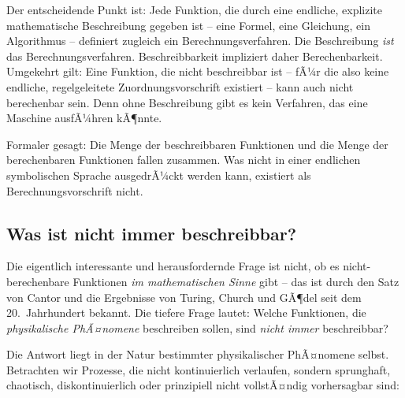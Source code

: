 ﻿\documentclass[12pt, a4paper]{article}
\begin{document}
	Der entscheidende Punkt ist: Jede Funktion, die durch eine endliche, explizite mathematische Beschreibung gegeben ist -- eine Formel, eine Gleichung, ein Algorithmus -- definiert zugleich ein Berechnungsverfahren. Die Beschreibung \textit{ist} das Berechnungsverfahren. Beschreibbarkeit impliziert daher Berechenbarkeit. Umgekehrt gilt: Eine Funktion, die nicht beschreibbar ist -- fÃ¼r die also keine endliche, regelgeleitete Zuordnungsvorschrift existiert -- kann auch nicht berechenbar sein. Denn ohne Beschreibung gibt es kein Verfahren, das eine Maschine ausfÃ¼hren kÃ¶nnte.

	Formaler gesagt: Die Menge der beschreibbaren Funktionen und die Menge der berechenbaren Funktionen fallen zusammen. Was nicht in einer endlichen symbolischen Sprache ausgedrÃ¼ckt werden kann, existiert als Berechnungsvorschrift nicht.

	\subsection{Was ist nicht immer beschreibbar?}

	Die eigentlich interessante und herausfordernde Frage ist nicht, ob es nicht-berechenbare Funktionen \textit{im mathematischen Sinne} gibt -- das ist durch den Satz von Cantor und die Ergebnisse von Turing, Church und GÃ¶del seit dem 20.~Jahrhundert bekannt. Die tiefere Frage lautet: Welche Funktionen, die \textit{physikalische PhÃ¤nomene} beschreiben sollen, sind \textit{nicht immer} beschreibbar?

	Die Antwort liegt in der Natur bestimmter physikalischer PhÃ¤nomene selbst. Betrachten wir Prozesse, die nicht kontinuierlich verlaufen, sondern sprunghaft, chaotisch, diskontinuierlich oder prinzipiell nicht vollstÃ¤ndig vorhersagbar sind:
\end{document}
